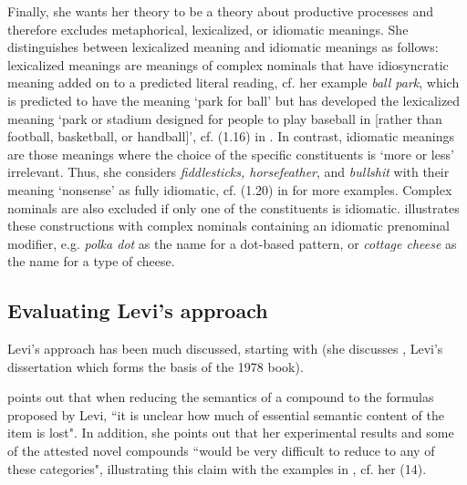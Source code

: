 Finally, she wants her theory to be a theory about productive processes and
therefore excludes
  metaphorical, lexicalized, or idiomatic meanings. She
  distinguishes between lexicalized meaning and idiomatic meanings as follows:
  lexicalized meanings are meanings of complex nominals that have
  idiosyncratic meaning added on to a
  predicted literal reading, cf. her example \emph{ball park}, which
  is predicted to have the meaning `park for ball' but has developed
  the lexicalized meaning `park or stadium designed for people to play
  baseball in [rather than football, basketball, or handball]',
  cf. (1.16) in \citet[10]{Levi:1978}. In contrast, idiomatic meanings are those meanings
  where the choice of the specific 
  constituents is `more or less' irrelevant. 
Thus, she considers \emph{fiddlesticks, horsefeather}, and \emph{bullshit} with their meaning
  `nonsense' as fully idiomatic, cf. (1.20) in \citet[12]{Levi:1978}
  for more examples. 
Complex nominals are also excluded if only one of the constituents is
idiomatic. \citet[12]{Levi:1978} illustrates these constructions with
complex nominals containing an idiomatic prenominal modifier, e.g.
\emph{polka dot} as the name for a dot-based pattern, or \emph{cottage
  cheese} as the name for a type of cheese. 

\subsection{Evaluating Levi's approach}
\label{sec:levi_eval}

Levi's approach has been much discussed, starting with
\citet{Downing:1977} (she discusses
\citealt{Levi:1975}, Levi's dissertation which forms the basis of the 1978
book). 

\citet[827]{Downing:1977} points out that when reducing the semantics of a
compound to the formulas proposed by Levi, ``it is unclear how much of
essential semantic content of the item is lost". In addition, she
points out that her experimental results and some of the attested novel
compounds ``would be very difficult to reduce to any of these
categories", illustrating this claim with the examples in \Next,
cf. her (14).

